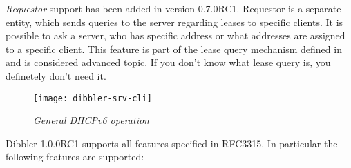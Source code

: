 \emph{Requestor} support has been added in version 0.7.0RC1. Requestor
is a separate entity, which sends queries to the server regarding
leases to specific clients. It is possible to ask a server, who has
specific address or what addresses are assigned to a specific client.
This feature is part of the lease query mechanism defined in
\cite{rfc5007} and is considered advanced topic. If you don't know
what lease query is, you definetely don't need it.

\begin{figure}[ht]
\begin{center}
\texttt{[image: dibbler-srv-cli]}
\caption{\emph{General DHCPv6 operation}}
\end{center}
\end{figure}

Dibbler 1.0.0RC1 supports all features specified in RFC3315. In
particular the following features are supported:
